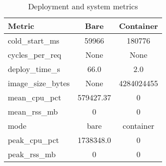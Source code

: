 \begin{table}[t]
\caption{Deployment and system metrics}
\centering
\begin{tabular}{lcc}
Metric & Bare & Container \\
\hline
cold\_start\_ms & 59966 & 180776 \\
cycles\_per\_req & None & None \\
deploy\_time\_s & 66.0 & 2.0 \\
image\_size\_bytes & None & 4284024455 \\
mean\_cpu\_pct & 579427.37 & 0 \\
mean\_rss\_mb & 0 & 0 \\
mode & bare & container \\
peak\_cpu\_pct & 1738348.0 & 0 \\
peak\_rss\_mb & 0 & 0 \\
\end{tabular}
\end{table}
